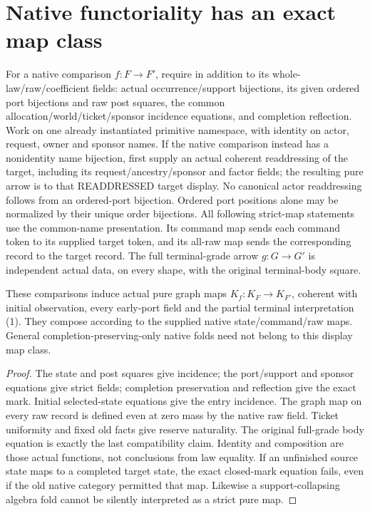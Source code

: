 \documentclass[11pt]{article}
\begin{document}
\section{Native functoriality has an exact map class}
For a native comparison $f:F\to F'$, require in addition to its whole-law/raw/coefficient fields: actual occurrence/support bijections, its given ordered port bijections and raw post squares, the common allocation/world/ticket/sponsor incidence equations, and completion reflection. Work on one already instantiated primitive namespace, with identity on actor, request, owner and sponsor names. If the native comparison instead has a nonidentity name bijection, first supply an actual coherent readdressing of the target, including its request/ancestry/sponsor and factor fields; the resulting pure arrow is to that READDRESSED target display. No canonical actor readdressing follows from an ordered-port bijection. Ordered port positions alone may be normalized by their unique order bijections. All following strict-map statements use the common-name presentation. Its command map sends each command token to its supplied target token, and its all-raw map sends the corresponding record to the target record. The full terminal-grade arrow $g:G\to G'$ is independent actual data, on every shape, with the original terminal-body square.

\begin{proposition}
These comparisons induce actual pure graph maps $K_f:K_F\to K_{F'}$, coherent with initial observation, every early-port field and the partial terminal interpretation (1). They compose according to the supplied native state/command/raw maps. General completion-preserving-only native folds need not belong to this display map class.
\end{proposition}
\begin{proof}
The state and post squares give incidence; the port/support and sponsor equations give strict fields; completion preservation and reflection give the exact mark. Initial selected-state equations give the entry incidence. The graph map on every raw record is defined even at zero mass by the native raw field. Ticket uniformity and fixed old facts give reserve naturality. The original full-grade body equation is exactly the last compatibility claim. Identity and composition are those actual functions, not conclusions from law equality. If an unfinished source state maps to a completed target state, the exact closed-mark equation fails, even if the old native category permitted that map. Likewise a support-collapsing algebra fold cannot be silently interpreted as a strict pure map.\end{proof}
\end{document}
